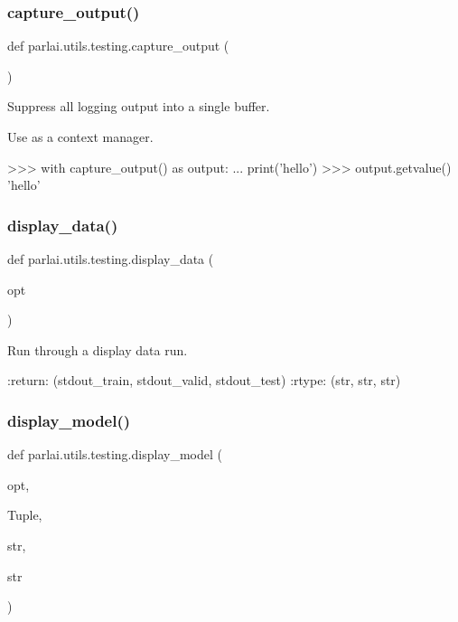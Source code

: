 \subsubsection{\texorpdfstring{capture\+\_\+output()}{capture\_output()}}
{\footnotesize\ttfamily def parlai.\+utils.\+testing.\+capture\+\_\+output (\begin{DoxyParamCaption}{ }\end{DoxyParamCaption})}

\begin{DoxyVerb}Suppress all logging output into a single buffer.

Use as a context manager.

>>> with capture_output() as output:
...     print('hello')
>>> output.getvalue()
'hello'
\end{DoxyVerb}
 \mbox{\label{namespaceparlai_1_1utils_1_1testing_a30c532f112f9beddd873382e649b3ecd}} 
\subsubsection{\texorpdfstring{display\+\_\+data()}{display\_data()}}
{\footnotesize\ttfamily def parlai.\+utils.\+testing.\+display\+\_\+data (\begin{DoxyParamCaption}\item[{}]{opt }\end{DoxyParamCaption})}

\begin{DoxyVerb}Run through a display data run.

:return: (stdout_train, stdout_valid, stdout_test)
:rtype: (str, str, str)
\end{DoxyVerb}
 \mbox{\label{namespaceparlai_1_1utils_1_1testing_a1b41200277931b2e4e684dc9452889a9}} 
\subsubsection{\texorpdfstring{display\+\_\+model()}{display\_model()}}
{\footnotesize\ttfamily def parlai.\+utils.\+testing.\+display\+\_\+model (\begin{DoxyParamCaption}\item[{}]{opt,  }\item[{}]{Tuple,  }\item[{}]{str,  }\item[{}]{str }\end{DoxyParamCaption})}

